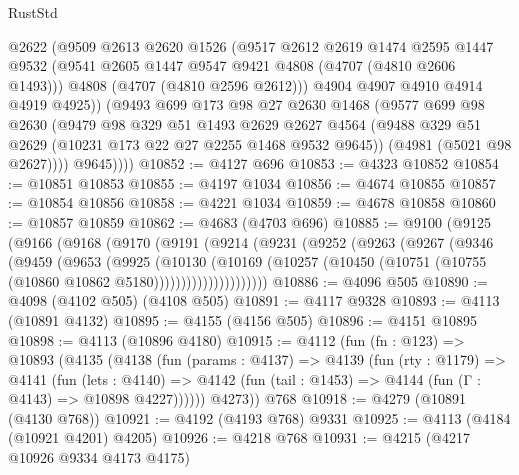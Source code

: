 \begin{lexlean}{RustStd}
\begin{coremodule}
            @2622
            (@9509
              @2613
              @2620
              @1526
              (@9517
                @2612
                @2619
                @1474
                @2595
                @1447
                @9532
                (@9541 @2605 @1447 @9547 @9421 @4808 (@4707 (@4810 @2606 @1493)))
                @4808
                (@4707 (@4810 @2596 @2612)))
              @4904
              @4907
              @4910
              @4914
              @4919
              @4925))
          (@9493
            @699
            @173
            @98
            @27
            @2630
            @1468
            (@9577
              @699
              @98
              @2630
              (@9479
                @98
                @329
                @51
                @1493
                @2629
                @2627
                @4564
                (@9488 @329 @51 @2629 (@10231 @173 @22 @27 @2255 @1468 @9532 @9645))
                (@4981 (@5021 @98 @2627))))
            @9645))))
@10852 := @4127 @696
@10853 := @4323 @10852
@10854 := @10851 @10853
@10855 := @4197 @1034
@10856 := @4674 @10855
@10857 := @10854 @10856
@10858 := @4221 @1034
@10859 := @4678 @10858
@10860 := @10857 @10859
@10862 := @4683 (@4703 @696)
@10885 := @9100
    (@9125
      (@9166
        (@9168
          (@9170
            (@9191
              (@9214
                (@9231
                  (@9252
                    (@9263
                      (@9267
                        (@9346
                          (@9459
                            (@9653
                              (@9925
                                (@10130
                                  (@10169
                                    (@10257
                                      (@10450
                                        (@10751 (@10755 (@10860 @10862 @5180)))))))))))))))))))))
@10886 := @4096 @505
@10890 := @4098 (@4102 @505) (@4108 @505)
@10891 := @4117 @9328
@10893 := @4113 (@10891 @4132)
@10895 := @4155 (@4156 @505)
@10896 := @4151 @10895
@10898 := @4113 (@10896 @4180)
@10915 := @4112
    (fun (fn : @123) =>
    @10893
      (@4135
        (@4138
          (fun (params : @4137) =>
          @4139
            (fun (rty : @1179) =>
            @4141
              (fun (lets : @4140) =>
              @4142 (fun (tail : @1453) => @4144 (fun (Γ : @4143) => @10898 @4227))))))
        @4273))
    @768
@10918 := @4279 (@10891 (@4130 @768))
@10921 := @4192 (@4193 @768) @9331
@10925 := @4113 (@4184 (@10921 @4201) @4205)
@10926 := @4218 @768
@10931 := @4215 (@4217 @10926 @9334 @4173 @4175)

\end{coremodule}
\end{lexlean}
